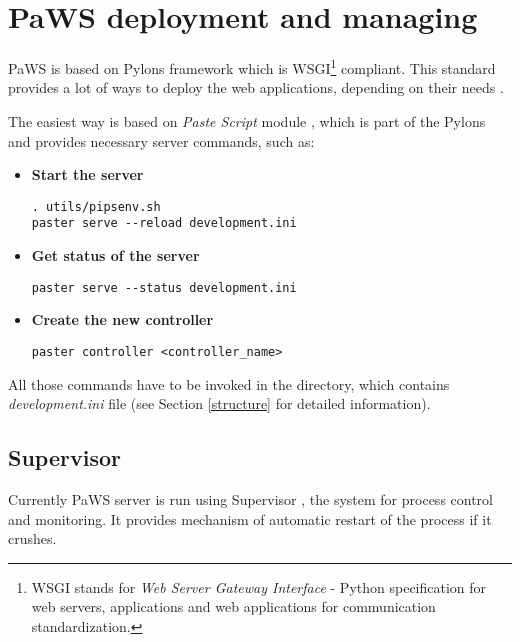 \section{PaWS deployment and managing}
\label{paws_managing}

PaWS is based on Pylons \cite{pylons} framework which is WSGI\footnote{WSGI stands for \emph{Web Server Gateway Interface} \cite{wsgi} - Python specification for web servers, applications and web applications for communication standardization.} compliant. This standard provides a lot of ways to deploy the web applications, depending on their needs \cite{python_app_deployment}.

The easiest way is based on \emph{Paste Script} module \cite{paster}, which is part of the Pylons and provides necessary server commands, such as:

\begin{itemize}
  \item {\bf Start the server}
  
\begin{lstlisting}
. utils/pipsenv.sh
paster serve --reload development.ini
\end{lstlisting}
  
  \item {\bf Get status of the server}
  
\begin{lstlisting}
paster serve --status development.ini
\end{lstlisting}
  
  \item {\bf Create the new controller}
  
\begin{lstlisting}
paster controller <controller_name>
\end{lstlisting}
  
\end{itemize}

All those commands have to be invoked in the directory, which contains \emph{development.ini} file (see Section \ref{structure} for detailed information).

\subsection{Supervisor}

Currently PaWS server is run using Supervisor \cite{supervisor}, the system for process control and monitoring. It provides mechanism of automatic restart of the process if it crushes.